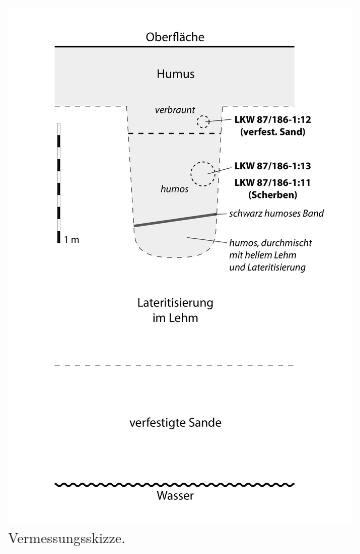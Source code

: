 \begin{figure}[!tb]
	\centering
	\begin{subfigure}[t]{0.32\textwidth}
		\centering
		\includegraphics[width = \textwidth]{fig/LKW87-186.pdf}
		\caption{Vermessungsskizze.}
		\label{fig:LKW87_186_Skizze}
	\end{subfigure}\hfill
	\begin{subfigure}[t]{0.32\textwidth}
		\centering

\end{subfigure}
\end{figure}
